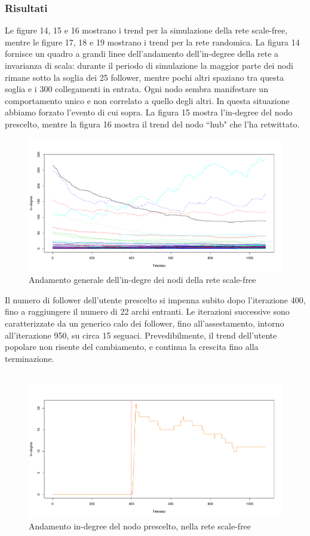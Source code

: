 \documentclass[a4paper,12pt]{article}
\begin{document}
\subsubsection{Risultati}
Le figure 14, 15 e 16 mostrano i trend per la simulazione della rete scale-free, mentre le figure 17, 18 e 19 mostrano i trend per la rete randomica.
La figura 14 fornisce un quadro a grandi linee dell'andamento dell'in-degree della rete a invarianza di scala: durante il periodo di simulazione la maggior parte dei nodi rimane sotto la soglia dei 25 follower, mentre pochi altri spaziano tra questa soglia e i 300 collegamenti in entrata. Ogni nodo sembra manifestare un comportamento unico e non correlato a quello degli altri. In questa situazione abbiamo forzato l'evento di cui sopra. La figura 15 mostra l'in-degree del nodo prescelto, mentre la figura 16 mostra il trend del nodo ``hub" che l'ha retwittato. 
\begin{figure}[H]
\centering
\includegraphics[scale=0.5]{images/totale_1000_sf_1080_1.pdf}
\caption{Andamento generale dell'in-degre dei nodi della rete scale-free}
\end{figure}
Il numero di follower dell'utente prescelto si impenna subito dopo l'iterazione 400, fino a raggiungere il numero di 22 archi entranti. Le iterazioni successive sono caratterizzate da un generico calo dei follower, fino all'assestamento, intorno all'iterazione 950, su circa 15 seguaci. Prevedibilmente, il trend dell'utente popolare non risente del cambiamento, e continua la crescita fino alla terminazione. \\ \\
\begin{figure}[H]
\centering
\includegraphics[scale=0.5]{images/prescelto_1000_sf_1080_1.pdf}
\caption{Andamento in-degree del nodo prescelto, nella rete scale-free}
\end{figure}
\end{document}
